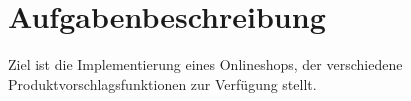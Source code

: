 \chapter{Aufgabenbeschreibung}
Ziel ist die Implementierung eines Onlineshops, der verschiedene Produktvorschlagsfunktionen zur Verfügung stellt.
